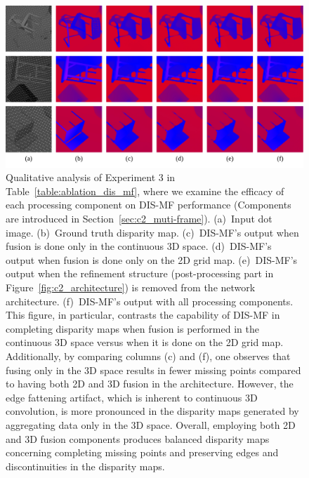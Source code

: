 \begin{figure}[t]
    \begin{center}
        \includegraphics[width=1.0\linewidth]{images/chapter2/supp_figures/ablation_mf_2d3d.jpg}
    \end{center}
   \caption{Qualitative analysis of Experiment 3 in Table~\ref{table:ablation_dis_mf}, where we examine the efficacy of each processing component on DIS-MF performance (Components are introduced in Section~\ref{sec:c2_muti-frame}). (a)~Input dot image. (b)~Ground truth disparity map. (c)~DIS-MF's output when fusion is done only in the continuous 3D space. (d)~DIS-MF's output when fusion is done only on the 2D grid map. (e)~DIS-MF's output when the refinement structure (post-processing part in Figure~\ref{fig:c2_architecture}) is removed from the network architecture. (f)~DIS-MF's output with all processing components. This figure, in particular, contrasts the capability of DIS-MF in completing disparity maps when fusion is performed in the continuous 3D space versus when it is done on the 2D grid map. Additionally, by comparing columns (c) and (f), one observes that fusing only in the 3D space results in fewer missing points compared to having both 2D and 3D fusion in the architecture. However, the edge fattening artifact, which is inherent to continuous 3D convolution, is more pronounced in the disparity maps generated by aggregating data only in the 3D space. Overall, employing both 2D and 3D fusion components produces balanced disparity maps concerning completing missing points and preserving edges and discontinuities in the disparity maps.}
    \label{fig:c2_ablation_mf_2d3d}
\end{figure}

